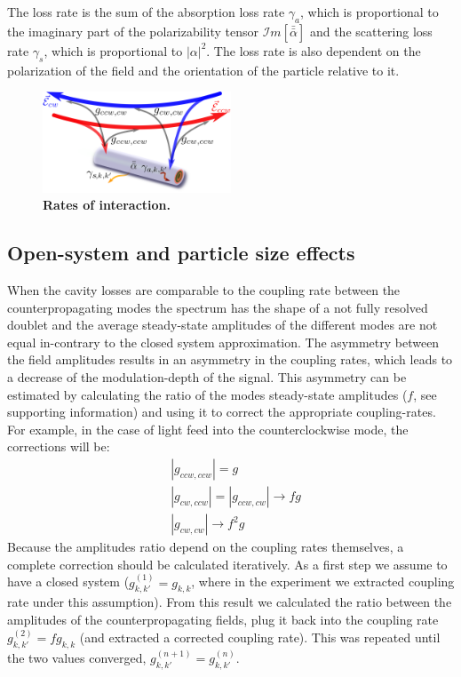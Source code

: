 \documentclass[journal=jacsat,manuscript=article]{achemso}
\begin{document}
The loss rate is the sum of the absorption loss rate $\gamma_a$, which is proportional to the imaginary part of the polarizability tensor $\mathcal{I}m[\bar{ \bar \alpha}]$ and the scattering loss rate $\gamma_s$, which is proportional to $|\alpha|^2$. The loss rate is also dependent on the polarization of the field and the orientation of the particle relative to it.
\begin{figure}[H]
\centering
             \includegraphics[trim=0cm 0.0cm 0.0cm 0.0cm, clip, width=0.5\textwidth]{Images/interaction.png}
             \caption{\textbf{Rates of interaction.} }
              \label{fig:cavity_tube_int}
  \end{figure}\vspace{-1cm}

\subsection{Open-system and particle size effects}

When the cavity losses are comparable to the coupling rate between the counterpropagating modes the spectrum has the shape of a not fully resolved doublet and the average steady-state amplitudes of the different modes are not equal in-contrary to the closed system approximation. The asymmetry between the field amplitudes results in an asymmetry in the coupling rates, which leads to a decrease of the modulation-depth of the signal. This asymmetry can be estimated by calculating the ratio of the modes steady-state amplitudes ($f$, see supporting information) and using it to correct the appropriate coupling-rates. For example, in the case of light feed into the counterclockwise mode, the corrections will be:
\begin{align*}
&\left| g_{ccw,ccw} \right| = g \\
&\left| g_{cw,ccw} \right| = \left| g_{ccw,cw} \right| \rightarrow f g \\
&\left| g_{cw,cw} \right| \rightarrow f^2 g
\end{align*}
Because the amplitudes ratio depend on the coupling rates themselves, a complete correction should be calculated iteratively. As a first step we assume to have a closed system ($g_{k,k'}^{(1)} = g_{k,k}$, where in the experiment we extracted coupling rate under this assumption). From this result we calculated the ratio between the amplitudes of the counterpropagating fields, plug it back into the coupling rate $g_{k,k'}^{(2)} = fg_{k,k}$ (and extracted a corrected coupling rate). This was repeated until the two values converged, $g_{k,k'}^{(n+1)} = g_{k,k'}^{(n)}$.
\end{document}
